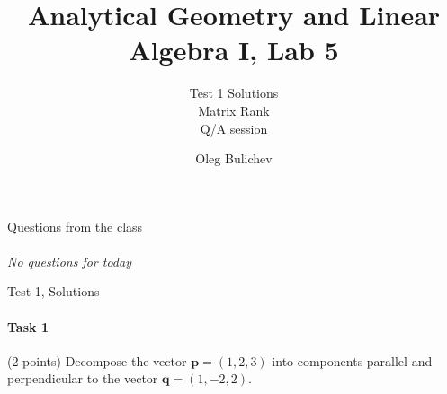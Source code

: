\documentclass[aspectratio=169]{beamer}
\title[AGLA1]{Analytical Geometry and Linear Algebra I, Lab 5} %
\subtitle{Test 1 Solutions \\ Matrix Rank \\ Q/A session   
         } %
\author{Oleg Bulichev}
\newcommand{\fbckg}[1]{\usebackgroundtemplate{\texttt{[image: \#1]}}}%
\begin{document}
\setlength{\abovedisplayskip}{0pt}
\setlength{\belowdisplayskip}{0pt}
\setlength{\abovedisplayshortskip}{0pt}
\setlength{\belowdisplayshortskip}{0pt}

\fbckg{fibeamer/figs/title_page.png}

\fbckg{fibeamer/figs/common.png}


\begin{frame}[c]{Questions from the class}
\framesubtitle{}
\centering
    \textit{ \Large No questions for today}
\end{frame}


\begin{frame}[t]{Test 1, Solutions}
\framesubtitle{Task 1}
(2 points) Decompose the vector $\textbf{p} = (1, 2, 3)$ into components parallel and perpendicular to the vector $\textbf{q} = (1, -2, 2)$.
\end{frame}
\end{document}
